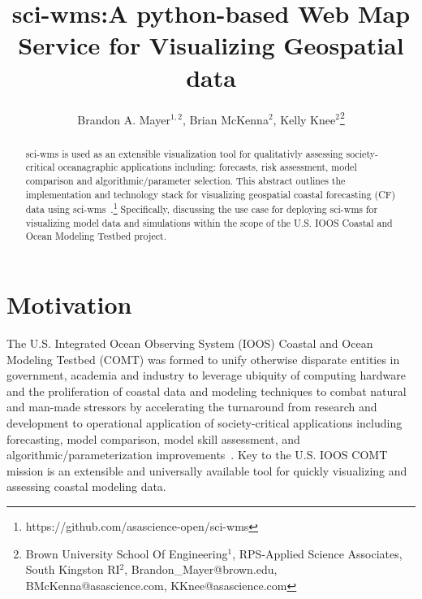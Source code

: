 \documentclass[11pt,twocolumn,twoside]{IEEEtran}
\newcommand{\comt}{COMT}
\newcommand{\ioos}{IOOS}
\newcommand{\sciwms}{sci-wms}
\begin{document}
\title{\vspace{0.2in}\sc sci-wms:A python-based Web Map Service for Visualizing Geospatial data}

\author{Brandon A. Mayer$^{1,2}$, Brian McKenna$^{2}$, Kelly Knee$^{2}$\thanks{Brown University School Of Engineering$^{1}$, RPS-Applied Science Associates, South Kingston RI$^{2}$, Brandon\_Mayer@brown.edu, BMcKenna@asascience.com, KKnee@asascience.com}}

\maketitle
\thispagestyle{fancy}

\begin{abstract}
\sciwms{} is used as an extensible visualization tool for qualitativly
assessing society-critical oceanagraphic applications including:
forecasts, risk assessment, model comparison and algorithmic/parameter
selection. This abstract outlines the implementation and technology
stack for visualizing geospatial coastal forecasting (CF) data using
sci-wms~\cite{wms14}.\footnote{https://github.com/asascience-open/sci-wms}
Specifically, discussing the use case for deploying \sciwms{} for visualizing
model data and simulations within the scope of the U.S. \ioos{} Coastal
and Ocean Modeling Testbed project.~\cite{luettich13}
\end{abstract}

\section{Motivation}
The U.S. Integrated Ocean Observing System (\ioos{}) Coastal and Ocean
Modeling Testbed (\comt{}) was formed to unify otherwise disparate
entities in government, academia and industry to leverage ubiquity of
computing hardware and the proliferation of coastal data and modeling
techniques to combat natural and man-made stressors by accelerating
the turnaround from research and development to operational
application of society-critical applications including forecasting,
model comparison, model skill assessment, and
algorithmic/parameterization improvements~\cite{luettich13}. Key to
the U.S. \ioos{} \comt{} mission is an extensible and universally
available tool for quickly visualizing and assessing coastal modeling data.
\end{document}
